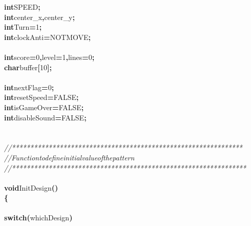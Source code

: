 \documentclass[a4paper, 10pt]{article}
\newcommand\SPC{\hspace*{0.6em}}
\newcommand{\CppAComment}[1]{\textit{\textcolor[rgb]{0.2,0.6,1}{#1}}}
\newcommand{\CppAIdentifier}[1]{#1}
\newcommand{\CppANumber}[1]{\textcolor[rgb]{0.5,0,0.5}{#1}}
\newcommand{\CppAReservedWord}[1]{\textbf{#1}}
\newcommand{\CppASpace}[1]{\colorbox[rgb]{1,1,1}{#1}}
\newcommand{\CppASymbol}[1]{\textbf{\textcolor[rgb]{1,0,0}{#1}}}
\begin{document}
\begin{ttfamily}
\CppAReservedWord{int}\CppASpace{\SPC }\CppAIdentifier{SPEED}\CppASymbol{;}\\
\CppAReservedWord{int}\CppASpace{\SPC }\CppAIdentifier{center\_x}\CppASymbol{,}\CppAIdentifier{center\_y}\CppASymbol{;}\\
\CppAReservedWord{int}\CppASpace{\SPC }\CppAIdentifier{Turn}\CppASymbol{=}\CppANumber{1}\CppASymbol{;}\\
\CppAReservedWord{int}\CppASpace{\SPC }\CppAIdentifier{clockAnti}\CppASpace{\SPC }\CppASymbol{=}\CppASpace{\SPC }\CppAIdentifier{NOTMOVE}\CppASymbol{;}\\
\\
\CppAReservedWord{int}\CppASpace{\SPC }\CppAIdentifier{score}\CppASymbol{=}\CppANumber{0}\CppASymbol{,}\CppASpace{\SPC }\CppAIdentifier{level}\CppASymbol{=}\CppANumber{1}\CppASymbol{,}\CppASpace{\SPC }\CppAIdentifier{lines}\CppASymbol{=}\CppANumber{0}\CppASymbol{;}\\
\CppAReservedWord{char}\CppASpace{\SPC }\CppAIdentifier{buffer}\CppASymbol{[}\CppANumber{10}\CppASymbol{]}\CppASymbol{;}\\
\\
\CppAReservedWord{int}\CppASpace{\SPC }\CppAIdentifier{nextFlag}\CppASymbol{=}\CppANumber{0}\CppASymbol{;}\\
\CppAReservedWord{int}\CppASpace{\SPC }\CppAIdentifier{resetSpeed}\CppASymbol{=}\CppAIdentifier{FALSE}\CppASymbol{;}\\
\CppAReservedWord{int}\CppASpace{\SPC }\CppAIdentifier{isGameOver}\CppASymbol{=}\CppAIdentifier{FALSE}\CppASymbol{;}\\
\CppAReservedWord{int}\CppASpace{\SPC }\CppAIdentifier{disableSound}\CppASymbol{=}\CppAIdentifier{FALSE}\CppASymbol{;}\\
\\
\\
\CppAComment{//***************************************************************}\\
\CppAComment{//\SPC \SPC \SPC \SPC Function\SPC to\SPC define\SPC initial\SPC value\SPC of\SPC the\SPC pattern}\\
\CppAComment{//****************************************************************}\\
\\
\CppAReservedWord{void}\CppASpace{\SPC }\CppAIdentifier{InitDesign}\CppASymbol{(}\CppASymbol{)}\\
\CppASymbol{\{}\\
\\
\CppASpace{\SPC }\CppAReservedWord{switch}\CppASymbol{(}\CppAIdentifier{whichDesign}\CppASymbol{)}\\

\end{ttfamily}
\end{document}

